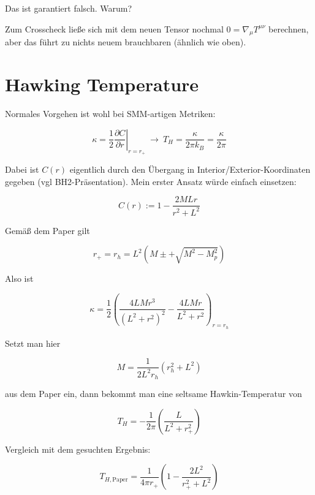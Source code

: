 \documentclass[12pt,a4paper]{article}
\begin{document}
Das ist garantiert falsch. Warum?

Zum Crosscheck ließe sich mit dem neuen Tensor nochmal $0 = \nabla_\mu T^{\mu \nu}$ berechnen, aber das führt zu nichts neuem brauchbaren (ähnlich wie oben).

\newpage
\section{Hawking Temperature}

Normales Vorgehen ist wohl bei SMM-artigen Metriken:

\begin{equation}
\kappa = \frac{1}{2} \left. \frac{\partial C}{\partial r}  \right|_{r=r_+}  ~ \rightarrow ~ T_H = \frac{\kappa}{2 \pi k_B} = \frac{\kappa}{2 \pi}
\end{equation}

Dabei ist $C(r)$ eigentlich durch den Übergang in Interior/Exterior-Koordinaten gegeben (vgl BH2-Präsentation). Mein erster Ansatz würde einfach einsetzen:

\begin{equation}
C(r) := 1 - \frac{2 M L r}{r^2 + L^2}
\end{equation}

Gemäß dem Paper gilt

\begin{equation}
r_+ = r_h = L^2 \left( M \pm + \sqrt{M^2 - M_p^2} \right)
\end{equation}

Also ist

\begin{equation}
\kappa = \frac{1}{2} \left( \frac{4 L M
   r^3}{\left(L^2+r^2\right)^2
   }-\frac{4 L M r}{L^2+r^2} \right)_{r = r_h}
\end{equation}

Setzt man hier

\begin{equation}
M = \frac{1}{2 L^2 r_h} (r_h^2 + L^2)
\end{equation}

aus dem Paper ein, dann bekommt man eine seltsame Hawkin-Temperatur von

\begin{equation}
T_H = - \frac{1}{2\pi} \left( \frac{L}{L^2 + r_+^2} \right)
\end{equation}

Vergleich mit dem gesuchten Ergebnis:

\begin{equation}
T_{H,\text{Paper}} = \frac{1}{4 \pi r_+} \left( 1 - \frac{2 L^2}{r_+^2 + L^2} \right)
\end{equation}
\end{document}
